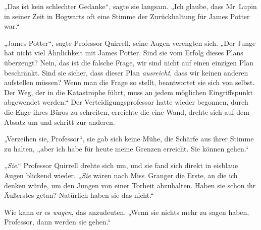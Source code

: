 „Das ist kein schlechter Gedanke“, sagte sie langsam.
„Ich glaube, dass Mr~Lupin in seiner Zeit in Hogwarts oft eine Stimme der Zurückhaltung für James Potter war.“

„James Potter“, sagte Professor Quirrell, seine Augen verengten sich.
„Der Junge hat nicht viel Ähnlichkeit mit James Potter. Sind sie vom Erfolg dieses Plans überzeugt? Nein, das ist die falsche Frage, wir sind nicht auf einen einzigen Plan beschränkt. Sind sie sicher, dass dieser Plan \emph{ausreicht}, dass wir keinen anderen aufstellen müssen? Wenn man die Frage so stellt, beantwortet sie sich von selbst. Der Weg, der in die Katastrophe führt, muss an jedem möglichen Eingriffspunkt abgewendet werden.“ Der Verteidigungsprofessor hatte wieder begonnen, durch die Enge ihres Büros zu schreiten, erreichte die eine Wand, drehte sich auf dem Absatz um und schritt zur anderen.

„Verzeihen sie, Professor“, sie gab sich keine Mühe, die Schärfe aus ihrer Stimme zu halten, „aber ich habe für heute meine Grenzen erreicht. Sie können gehen.“

„\emph{Sie}.“ Professor Quirrell drehte sich um, und sie fand sich direkt in eisblaue Augen blickend wieder.
„\emph{Sie} wären nach Miss~Granger die Erste, an die ich denken würde, um den Jungen von einer Torheit abzuhalten. Haben sie schon ihr Äußerstes getan? Natürlich haben sie das nicht.“

Wie kann er es \emph{wagen}, das anzudeuten.
„Wenn sie nichts mehr zu sagen haben, Professor, dann werden sie gehen.“

